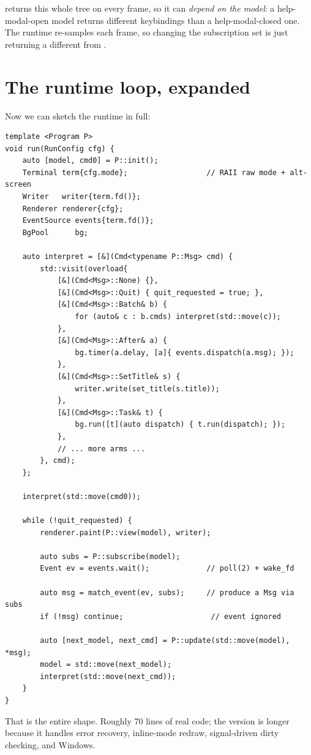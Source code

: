  returns this whole tree on every frame, so it can
\emph{depend on the model}: a help-modal-open model returns
different keybindings than a help-modal-closed one. The runtime
re-samples each frame, so changing the subscription set is just
returning a different  from .

\section{The runtime loop, expanded}

Now we can sketch the runtime in full:

\begin{lstlisting}
template <Program P>
void run(RunConfig cfg) {
    auto [model, cmd0] = P::init();
    Terminal term{cfg.mode};                  // RAII raw mode + alt-screen
    Writer   writer{term.fd()};
    Renderer renderer{cfg};
    EventSource events{term.fd()};
    BgPool      bg;

    auto interpret = [&](Cmd<typename P::Msg> cmd) {
        std::visit(overload{
            [&](Cmd<Msg>::None) {},
            [&](Cmd<Msg>::Quit) { quit_requested = true; },
            [&](Cmd<Msg>::Batch& b) {
                for (auto& c : b.cmds) interpret(std::move(c));
            },
            [&](Cmd<Msg>::After& a) {
                bg.timer(a.delay, [a]{ events.dispatch(a.msg); });
            },
            [&](Cmd<Msg>::SetTitle& s) {
                writer.write(set_title(s.title));
            },
            [&](Cmd<Msg>::Task& t) {
                bg.run([t](auto dispatch) { t.run(dispatch); });
            },
            // ... more arms ...
        }, cmd);
    };

    interpret(std::move(cmd0));

    while (!quit_requested) {
        renderer.paint(P::view(model), writer);

        auto subs = P::subscribe(model);
        Event ev = events.wait();             // poll(2) + wake_fd

        auto msg = match_event(ev, subs);     // produce a Msg via subs
        if (!msg) continue;                    // event ignored

        auto [next_model, next_cmd] = P::update(std::move(model), *msg);
        model = std::move(next_model);
        interpret(std::move(next_cmd));
    }
}
\end{lstlisting}

That is the entire shape. Roughly 70 lines of real code; the
\maya{} version is longer because it handles error recovery,
inline-mode redraw, signal-driven dirty checking, and Windows.

